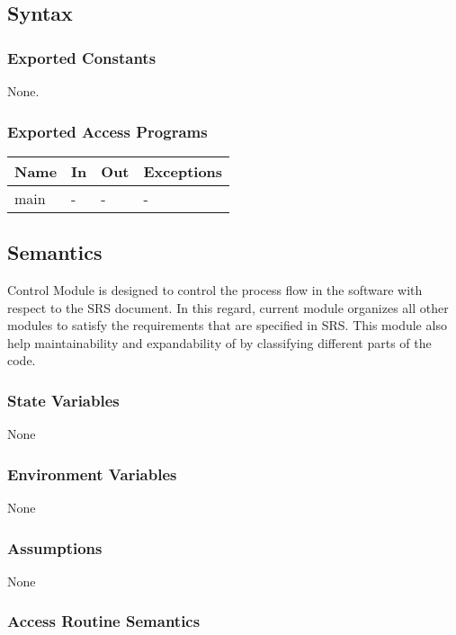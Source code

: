 \documentclass[12pt, titlepage]{article}
\begin{document}
	\subsection{Syntax}
	
	\subsubsection{Exported Constants} None. \subsubsection{Exported Access
		Programs}
	
	\begin{center} \begin{tabular}{p{2cm} p{4cm} p{4cm} p{2cm}} \hline
			\textbf{Name} & \textbf{In} & \textbf{Out} & \textbf{Exceptions} \\ \hline main
			& - & - & - \\ \hline \end{tabular} \end{center}
	
	\subsection{Semantics} \progname{} Control Module is designed to control the
	process flow in the software with respect to the SRS document. In this regard,
	current module organizes all other modules to satisfy the requirements that are
	specified in SRS. This module also help maintainability and expandability of
	\progname{} by classifying different parts of the code.
	
	\subsubsection{State Variables}
	
	None
	
	\subsubsection{Environment Variables}
	
	None
	
	\subsubsection{Assumptions}
	
	None
	
	\subsubsection{Access Routine Semantics}
	
\end{document}
